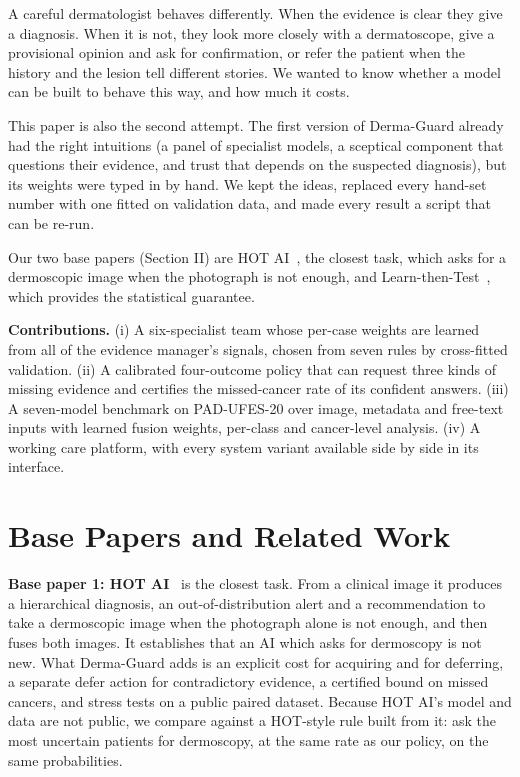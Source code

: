 \documentclass[conference]{IEEEtran}
\begin{document}
A careful dermatologist behaves differently. When the evidence is clear they give a diagnosis. When it is not, they look more closely with a dermatoscope, give a provisional opinion and ask for confirmation, or refer the patient when the history and the lesion tell different stories. We wanted to know whether a model can be built to behave this way, and how much it costs.

This paper is also the second attempt. The first version of Derma-Guard already had the right intuitions (a panel of specialist models, a sceptical component that questions their evidence, and trust that depends on the suspected diagnosis), but its weights were typed in by hand. We kept the ideas, replaced every hand-set number with one fitted on validation data, and made every result a script that can be re-run.

Our two base papers (Section II) are HOT AI~\cite{r2}, the closest task, which asks for a dermoscopic image when the photograph is not enough, and Learn-then-Test~\cite{r3}, which provides the statistical guarantee.

\textbf{Contributions.} (i) A six-specialist team whose per-case weights are learned from all of the evidence manager's signals, chosen from seven rules by cross-fitted validation. (ii) A calibrated four-outcome policy that can request three kinds of missing evidence and certifies the missed-cancer rate of its confident answers. (iii) A seven-model benchmark on PAD-UFES-20 over image, metadata and free-text inputs with learned fusion weights, per-class and cancer-level analysis. (iv) A working care platform, with every system variant available side by side in its interface.

\section{Base Papers and Related Work}
\textbf{Base paper 1: HOT AI}~\cite{r2} is the closest task. From a clinical image it produces a hierarchical diagnosis, an out-of-distribution alert and a recommendation to take a dermoscopic image when the photograph alone is not enough, and then fuses both images. It establishes that an AI which asks for dermoscopy is not new. What Derma-Guard adds is an explicit cost for acquiring and for deferring, a separate defer action for contradictory evidence, a certified bound on missed cancers, and stress tests on a public paired dataset. Because HOT AI's model and data are not public, we compare against a HOT-style rule built from it: ask the most uncertain patients for dermoscopy, at the same rate as our policy, on the same probabilities.
\end{document}
